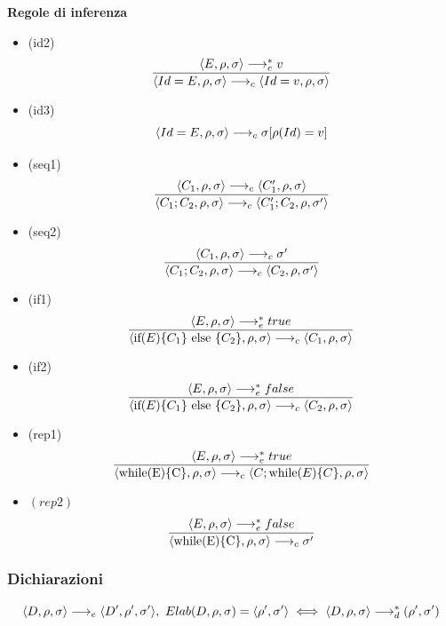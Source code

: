 \documentclass{article}
\begin{document}
\noindent\textbf{Regole di inferenza}
\begin{itemize}
    \item (id2)
          \[\frac
              {\langle E,\rho,\sigma \rangle \longrightarrow_c^* v}
              {\langle Id = E,\rho,\sigma \rangle \longrightarrow_c \langle Id = v,\rho,\sigma \rangle}\]
    \item (id3)
          \[\langle Id = E,\rho,\sigma \rangle \longrightarrow_c \sigma[\rho(Id) = v]\]

    \item (seq1)
          \[\frac
              {\langle C_1,\rho,\sigma \rangle \longrightarrow_c \langle C_1',\rho,\sigma \rangle}
              {\langle C_1;C_2,\rho,\sigma \rangle \longrightarrow_c \langle C_1';C_2,\rho,\sigma' \rangle}\]
    \item (seq2)
          \[\frac
              {\langle C_1,\rho,\sigma \rangle \longrightarrow_c \sigma'}
              {\langle C_1;C_2,\rho,\sigma \rangle \longrightarrow_c \langle C_2,\rho,\sigma' \rangle}\]

    \item (if1)
          \[\frac
              {\langle E,\rho,\sigma \rangle \longrightarrow_e^* true}
              {\langle \text{if($E$)\{$C_1$\} else \{$C_2$\}},\rho,\sigma \rangle \longrightarrow_c \langle C_1,\rho,\sigma \rangle}\]
    \item (if2)
          \[\frac
              {\langle E,\rho,\sigma \rangle \longrightarrow_e^* false}
              {\langle \text{if($E$)\{$C_1$\} else \{$C_2$\}},\rho,\sigma \rangle \longrightarrow_c \langle C_2,\rho,\sigma \rangle}\]

    \item (rep1)
          \[\frac
              {\langle E,\rho,\sigma \rangle \longrightarrow_e^* true}
              {\langle \text{while(E)\{C\}},\rho,\sigma \rangle \longrightarrow_c \langle C;\text{while($E$)\{$C$\}},\rho,\sigma \rangle}\]
    \item \((rep2)\)
          \[\frac
              {\langle E,\rho,\sigma \rangle \longrightarrow_e^* false}
              {\langle \text{while(E)\{C\}},\rho,\sigma \rangle \longrightarrow_c \sigma'}\]
\end{itemize}

\subsubsection{Dichiarazioni}
\[\langle D,\rho,\sigma \rangle \longrightarrow_e \langle D',\rho',\sigma' \rangle,\ Elab(D,\rho,\sigma) = \langle \rho',\sigma' \rangle \iff \langle D,\rho,\sigma \rangle \longrightarrow_d^* (\rho',\sigma')\]
\end{document}
